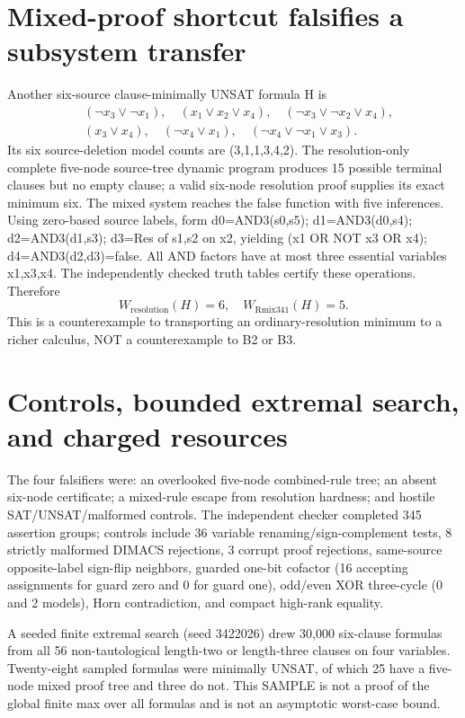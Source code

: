\documentclass[11pt]{article}
\begin{document}
\section{Mixed-proof shortcut falsifies a subsystem transfer}
Another six-source clause-minimally UNSAT formula H is
\[
\begin{split}
&(\neg x_3\vee\neg x_1),\quad
(x_1\vee x_2\vee x_4),\quad
(\neg x_3\vee\neg x_2\vee x_4),\\
&(x_3\vee x_4),\quad
(\neg x_4\vee x_1),\quad
(\neg x_4\vee\neg x_1\vee x_3).
\end{split}
\]
Its six source-deletion model counts are (3,1,1,3,4,2). The resolution-only complete five-node source-tree dynamic program produces 15 possible terminal clauses but no empty clause; a valid six-node resolution proof supplies its exact minimum six. The mixed system reaches the false function with five inferences. Using zero-based source labels, form d0=AND3(s0,s5); d1=AND3(d0,s4); d2=AND3(d1,s3); d3=Res of s1,s2 on x2, yielding (x1 OR NOT x3 OR x4); d4=AND3(d2,d3)=false. All AND factors have at most three essential variables {x1,x3,x4}. The independently checked truth tables certify these operations. Therefore
\[
\boxed{W_{\mathrm{resolution}}(H)=6,\quad W_{\mathrm{Rmix341}}(H)=5}.
\]
This is a counterexample to transporting an ordinary-resolution minimum to a richer calculus, NOT a counterexample to B2 or B3.

\section{Controls, bounded extremal search, and charged resources}
The four falsifiers were: an overlooked five-node combined-rule tree; an absent six-node certificate; a mixed-rule escape from resolution hardness; and hostile SAT/UNSAT/malformed controls. The independent checker completed 345 assertion groups; controls include 36 variable renaming/sign-complement tests, 8 strictly malformed DIMACS rejections, 3 corrupt proof rejections, same-source opposite-label sign-flip neighbors, guarded one-bit cofactor (16 accepting assignments for guard zero and 0 for guard one), odd/even XOR three-cycle (0 and 2 models), Horn contradiction, and compact high-rank equality.

A seeded finite extremal search (seed 3422026) drew 30,000 six-clause formulas from all 56 non-tautological length-two or length-three clauses on four variables. Twenty-eight sampled formulas were minimally UNSAT, of which 25 have a five-node mixed proof tree and three do not. This SAMPLE is not a proof of the global finite max over all formulas and is not an asymptotic worst-case bound.
\end{document}
